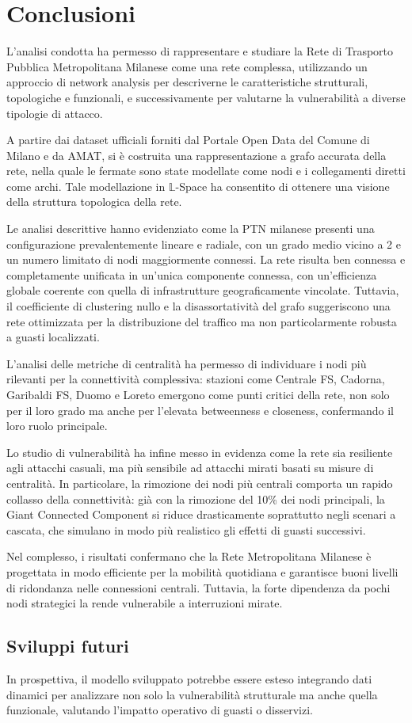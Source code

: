 \chapter{Conclusioni}

L’analisi condotta ha permesso di rappresentare e studiare la Rete di Trasporto Pubblica Metropolitana Milanese come una rete complessa, utilizzando un approccio di network analysis per descriverne le caratteristiche strutturali, topologiche e funzionali, e successivamente per valutarne la vulnerabilità a diverse tipologie di attacco.

A partire dai dataset ufficiali forniti dal Portale Open Data del Comune di Milano e da AMAT, si è costruita una rappresentazione a grafo accurata della rete, nella quale le fermate sono state modellate come nodi e i collegamenti diretti come archi. Tale modellazione in $\mathbb{L}$-Space ha consentito di ottenere una visione della struttura topologica della rete.

Le analisi descrittive hanno evidenziato come la PTN milanese presenti una configurazione prevalentemente lineare e radiale, con un grado medio vicino a 2 e un numero limitato di nodi maggiormente connessi. La rete risulta ben connessa e completamente unificata in un’unica componente connessa, con un’efficienza globale coerente con quella di infrastrutture geograficamente vincolate. Tuttavia, il coefficiente di clustering nullo e la disassortatività del grafo suggeriscono una rete ottimizzata per la distribuzione del traffico ma non particolarmente robusta a guasti localizzati.

L’analisi delle metriche di centralità ha permesso di individuare i nodi più rilevanti per la connettività complessiva: stazioni come Centrale FS, Cadorna, Garibaldi FS, Duomo e Loreto emergono come punti critici della rete, non solo per il loro grado ma anche per l’elevata betweenness e closeness, confermando il loro ruolo principale.

Lo studio di vulnerabilità ha infine messo in evidenza come la rete sia resiliente agli attacchi casuali, ma più sensibile ad attacchi mirati basati su misure di centralità. In particolare, la rimozione dei nodi più centrali comporta un rapido collasso della connettività: già con la rimozione del 10\% dei nodi principali, la Giant Connected Component si riduce drasticamente soprattutto negli scenari a cascata, che simulano in modo più realistico gli effetti di guasti successivi. 

Nel complesso, i risultati confermano che la Rete Metropolitana Milanese è progettata in modo efficiente per la mobilità quotidiana e garantisce buoni livelli di ridondanza nelle connessioni centrali. Tuttavia, la forte dipendenza da pochi nodi strategici la rende vulnerabile a interruzioni mirate.

\section{Sviluppi futuri}
In prospettiva, il modello sviluppato potrebbe essere esteso integrando dati dinamici per analizzare non solo la vulnerabilità strutturale ma anche quella funzionale, valutando l’impatto operativo di guasti o disservizi.